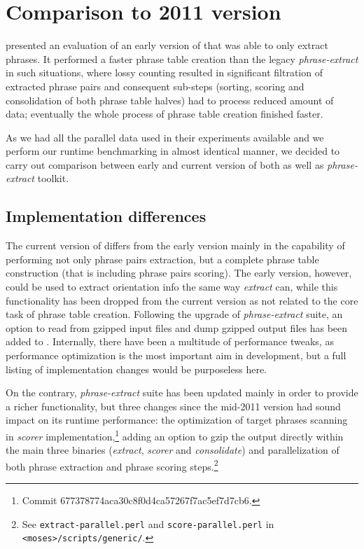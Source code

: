 \section{Comparison to 2011 version}

\citet{przywara:eppex} presented an evaluation of an early version of \eppex{}
that was able to only extract phrases. It performed a faster phrase
table creation than the legacy \emph{phrase-extract} in such situations,
where lossy counting resulted in significant filtration of extracted phrase
pairs and consequent sub-steps (sorting, scoring and consolidation of both
phrase table halves) had to process reduced amount of data;
eventually the whole process of phrase table creation finished faster.

As we had all the parallel data used in their experiments available and
we perform our runtime benchmarking in almost identical manner,
we decided to carry out comparison between early and current version of
both \eppex{} as well as \emph{phrase-extract} toolkit.

\subsection{Implementation differences}

The current version of \eppex{} differs from the early version mainly in the
capability of performing not only phrase pairs extraction, but a complete
phrase table construction (that is including phrase pairs scoring).
The early version, however, could be used to extract orientation info
the same way \emph{extract} can, while this functionality has been dropped
from the current version as not related to the core task of phrase table creation.
Following the upgrade of \emph{phrase-extract} suite, an option to read from
gzipped input files and dump gzipped output files has been added to \eppex{}.
Internally, there have been a multitude of performance tweaks,
as performance optimization is the most important aim in \eppex{} development,
but a full listing of implementation changes would be purposeless here.

On the contrary, \emph{phrase-extract} suite has been updated mainly in order to
provide a richer functionality, but three changes since the mid-2011 version
had sound impact on its runtime performance: the optimization of target phrases
scanning in \emph{scorer} implementation,\footnote{Commit 677378774aca30c8f0d4ca57267f7ac5ef7d7cb6.}
adding an option to gzip the output directly within the main three binaries
(\emph{extract}, \emph{scorer} and \emph{consolidate})
and parallelization of both phrase extraction and phrase scoring
steps.\footnote{See \texttt{extract-parallel.perl} and \texttt{score-parallel.perl}
in \texttt{<moses>/scripts/generic/}.}

